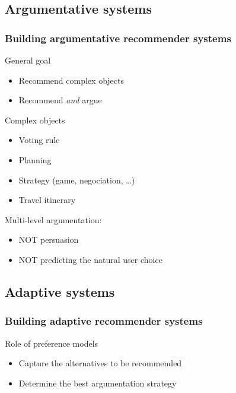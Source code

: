 \documentclass[english]{beamer}
\begin{document}
\subsection{Argumentative systems}
\begin{frame}
	\frametitle{Building argumentative recommender systems}
	
	\begin{block}{General goal}
		\begin{itemize}
			\item Recommend complex objects
			\item Recommend \emph{and} argue
		\end{itemize}
	\end{block}
	\begin{block}{Complex objects}
		\begin{itemize}
			\item Voting rule
			\item Planning
			\item Strategy (game, negociation, …)
			\item Travel itinerary
		\end{itemize}
	\end{block}
	Multi-level argumentation:
	\begin{itemize}
		\item NOT persuasion
		\item NOT predicting the natural user choice
	\end{itemize}
\end{frame}

\subsection{Adaptive systems}
\begin{frame}
	\frametitle{Building adaptive recommender systems}
	
	\begin{block}{Role of preference models}
		\begin{itemize}
			\item Capture the alternatives to be recommended
			\item Determine the best argumentation strategy
		\end{itemize}
	\end{block}
\end{frame}
\end{document}

